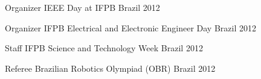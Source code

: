 \begin{cvhonors}
\cvhonor
    {Organizer} %
    {IEEE Day at IFPB} %
    {Brazil} %
    {2012} %
    
  \cvhonor
    {Organizer} %
    {IFPB Electrical and Electronic Engineer Day} %
    {Brazil} %
    {2012} %
        
  \cvhonor
    {Staff} %
    {IFPB Science and Technology Week} %
    {Brazil} %
    {2012} %

  \cvhonor
    {Referee} %
    {Brazilian Robotics Olympiad (OBR)} %
    {Brazil} %
    {2012} %
 
\end{cvhonors}
